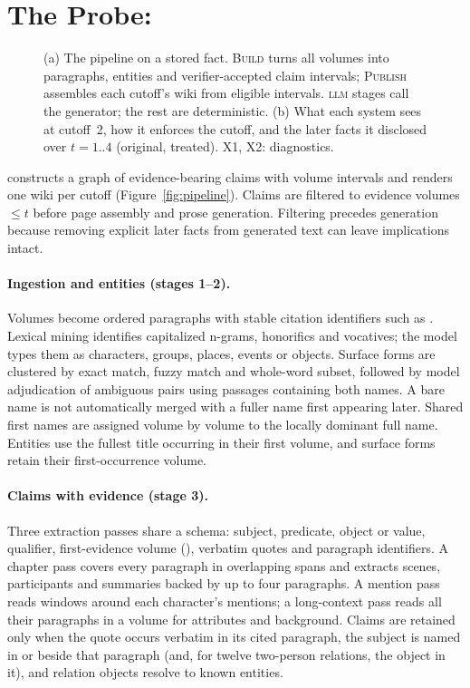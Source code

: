 \section{The Probe: \sys}
\label{sec:method}

\begin{figure}[t]
\centering
\resizebox{\textwidth}{!}{}
\caption{(a) The \sys pipeline on a stored fact. \textsc{Build} turns all volumes into
paragraphs, entities and verifier-accepted claim intervals; \textsc{Publish} assembles each
cutoff's wiki from eligible intervals. \textsc{llm} stages call the generator; the rest are
deterministic. (b) What each system sees at cutoff~2, how it enforces the cutoff, and the
later facts it disclosed over $t=1..4$ (original, treated). X1, X2: diagnostics.}
\label{fig:pipeline}\label{fig:systems}
\end{figure}

\sys constructs a graph of evidence-bearing claims with volume intervals and renders one
wiki per cutoff (Figure~\ref{fig:pipeline}). Claims are filtered to evidence volumes $\le t$
before page assembly and prose generation. Filtering precedes generation because removing
explicit later facts from generated text can leave implications intact.

\paragraph{Ingestion and entities (stages 1--2).}
Volumes become ordered paragraphs with stable citation identifiers such as
. Lexical mining identifies capitalized n-grams, honorifics and vocatives;
the model types them as characters, groups, places, events or objects. Surface forms are
clustered by exact match, fuzzy match and whole-word subset, followed by model adjudication
of ambiguous pairs using passages containing both names. A bare name is not automatically
merged with a fuller name first appearing later. Shared first names are assigned
volume by volume to the locally dominant full name. Entities use the fullest title occurring
in their first volume, and surface forms retain their first-occurrence volume.

\paragraph{Claims with evidence (stage 3).}
Three extraction passes share a schema: subject, predicate, object or value, qualifier,
first-evidence volume (\firstvol), verbatim quotes and paragraph identifiers.
A chapter pass covers every paragraph in overlapping spans and extracts scenes, participants
and summaries backed by up to four paragraphs. A mention pass reads windows around each
character's mentions; a long-context pass reads all their paragraphs in a volume for
attributes and background. Claims are retained only when the quote occurs verbatim in its
cited paragraph, the subject is named in or beside that paragraph (and, for twelve
two-person relations, the object in it), and relation objects resolve to known entities.

